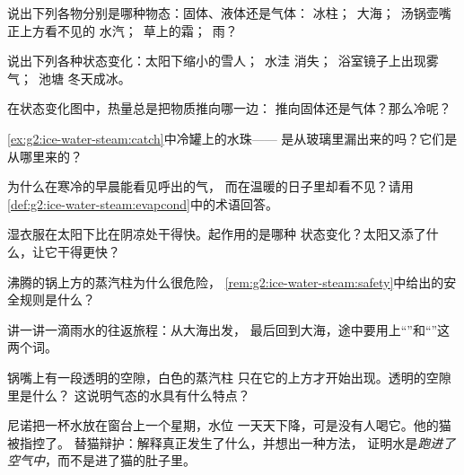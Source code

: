 \begin{exercise}[$\star$]\label{exo:g2:ice-water-steam:1}
说出下列各物分别是哪种物态：固体、液体还是气体：
冰柱；\ 大海；\ 汤锅壶嘴正上方看不见的
水汽；\ 草上的霜；\ 雨？
\end{exercise}

\begin{exercise}[$\star$]\label{exo:g2:ice-water-steam:2}
说出下列各种状态变化：太阳下缩小的雪人；\ 水洼
消失；\ 浴室镜子上出现雾气；\ 池塘
冬天成冰。
\end{exercise}

\begin{exercise}[$\star$]\label{exo:g2:ice-water-steam:3}
在状态变化图中，热量总是把物质推向哪一边：
推向固体还是气体？那么冷呢？
\end{exercise}

\begin{exercise}[$\star$]\label{exo:g2:ice-water-steam:4}
\cref{ex:g2:ice-water-steam:catch}中冷罐上的水珠——
是从玻璃里漏出来的吗？它们是从哪里来的？
\end{exercise}

\begin{exercise}[$\star$]\label{exo:g2:ice-water-steam:5}
为什么在寒冷的早晨能看见呼出的气，
而在温暖的日子里却看不见？请用\cref{def:g2:ice-water-steam:evapcond}中的术语回答。
\end{exercise}

\begin{exercise}[$\star$]\label{exo:g2:ice-water-steam:6}
湿衣服在太阳下比在阴凉处干得快。起作用的是哪种
状态变化？太阳又添了什么，让它干得更快？
\end{exercise}

\begin{exercise}[$\star$]\label{exo:g2:ice-water-steam:7}
沸腾的锅上方的蒸汽柱为什么很危险，
\cref{rem:g2:ice-water-steam:safety}中给出的安全规则是什么？
\end{exercise}

\begin{exercise}[$\star$]\label{exo:g2:ice-water-steam:8}
讲一讲一滴雨水的往返旅程：从大海出发，
最后回到大海，途中要用上“”和“”这两个词。
\end{exercise}

\begin{exercise}[$\star\star$]\label{exo:g2:ice-water-steam:9}
锅嘴上有一段透明的空隙，白色的蒸汽柱
只在它的上方才开始出现。透明的空隙里是什么？
这说明气态的水具有什么特点？
\end{exercise}

\begin{exercise}[$\star\star$]\label{exo:g2:ice-water-steam:10}
尼诺把一杯水放在窗台上一个星期，水位
一天天下降，可是没有人喝它。他的猫被指控了。
替猫辩护：解释真正发生了什么，并想出一种方法，
证明水是\emph{跑进了空气中}，而不是进了猫的肚子里。
\end{exercise}
